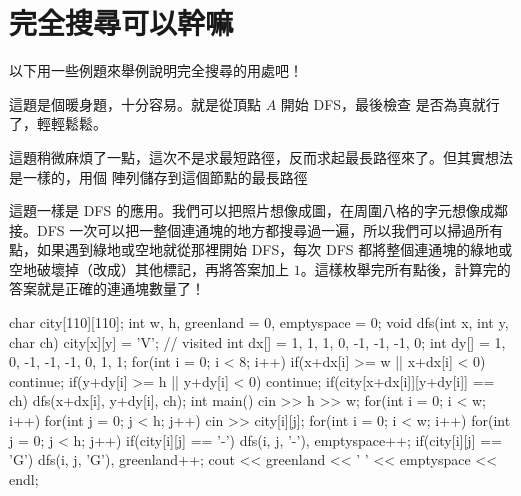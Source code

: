 \section{完全搜尋可以幹嘛}
以下用一些例題來舉例說明完全搜尋的用處吧！\\


這題是個暖身題，十分容易。就是從頂點 $A$ 開始 DFS，最後檢查  是否為真就行了，輕輕鬆鬆。\\


這題稍微麻煩了一點，這次不是求最短路徑，反而求起最長路徑來了。但其實想法是一樣的，用個  陣列儲存到這個節點的最長路徑\\


這題一樣是 DFS 的應用。我們可以把照片想像成圖，在周圍八格的字元想像成鄰接。DFS 一次可以把一整個連通塊的地方都搜尋過一遍，所以我們可以掃過所有點，如果遇到綠地或空地就從那裡開始 DFS，每次 DFS 都將整個連通塊的綠地或空地破壞掉（改成）其他標記，再將答案加上 $1$。這樣枚舉完所有點後，計算完的答案就是正確的連通塊數量了！\\

\begin{C++}
char city[110][110];
int w, h, greenland = 0, emptyspace = 0;
void dfs(int x, int y, char ch){
    city[x][y] = 'V'; // visited
    int dx[] = {1,  1,  1,  0, -1, -1, -1,  0};
    int dy[] = {1,  0, -1, -1, -1,  0,  1,  1};
    for(int i = 0; i < 8; i++){
        if(x+dx[i] >= w || x+dx[i] < 0) continue;
        if(y+dy[i] >= h || y+dy[i] < 0) continue;
        if(city[x+dx[i]][y+dy[i]] == ch){
            dfs(x+dx[i], y+dy[i], ch);
        }
    }
}
int main(){
    cin >> h >> w;
    for(int i = 0; i < w; i++){
        for(int j = 0; j < h; j++)
            cin >> city[i][j];
    }
    for(int i = 0; i < w; i++){
        for(int j = 0; j < h; j++){
            if(city[i][j] == '-')
                dfs(i, j, '-'), emptyspace++;
            if(city[i][j] == 'G')
                dfs(i, j, 'G'), greenland++;
        }
    }
    cout << greenland << ' ' << emptyspace << endl;
}

\end{C++}


